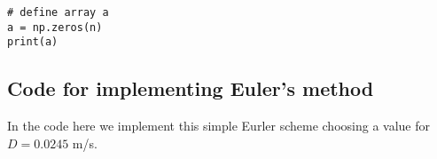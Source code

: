 \documentclass[%
oneside,                 %
final,                   %
10pt]{article}
\begin{document}
\begin{verbatim}
# define array a
a = np.zeros(n)
print(a)

\end{verbatim}


\subsection*{Code for implementing Euler's method}
In the code here we implement this simple Eurler scheme choosing a value for $D=0.0245$ m/s. 
\end{document}
